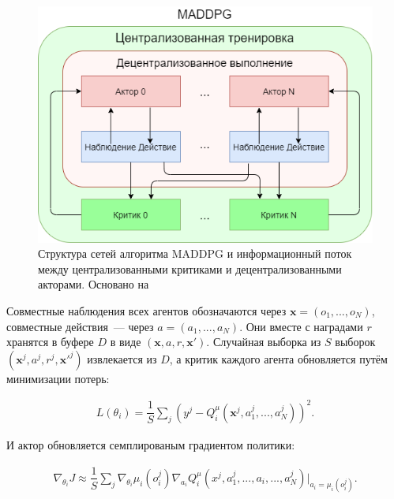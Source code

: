 \begin{figure}[ht!]
    \center
    \includegraphics [scale=0.80] {my_folder/images/ch2/maddpg.png}
    \caption{Структура сетей алгоритма MADDPG и информационный поток между централизованными критиками и децентрализованными акторами. Основано на \cite{lowe2017multiagent}}
    \label{fig:ch2-maddpg}
\end{figure}

Совместные наблюдения всех агентов обозначаются через ${\mathbf{x} = (o_1, ..., o_N)}$, совместные действия~--- через ${a = (a_1, ..., a_N)}$. Они вместе с наградами $r$ хранятся в буфере $D$ в виде ${(\mathbf{x}, a, r, \mathbf{x}')}$. Случайная выборка из $S$ выборок ${(\mathbf{x}^j, a^j, r^j, \mathbf{x}'^j)}$ извлекается из $D$, а критик каждого агента обновляется путём минимизации потерь:

\begin{equation}
    \begin{multlined}
        L(\theta_i) = \dfrac{1}{S} \sum_j (y^j - Q_{i}^\mu (\mathbf x^j, a_{1}^j, ...,a_{N}^j))^2.
    \end{multlined}
\end{equation}

И актор обновляется семплированым градиентом политики:

\begin{equation}
    \begin{multlined}
        \nabla_{\theta_i} J \approx \dfrac{1}{S} \sum_j \nabla_{\theta_i} \mu_i (o^j_i) \nabla_{a_i} Q^\mu_i (x^j, a^j_1, ..., a_i, ..., a^j_N)|_{a_i=\mu_i(o^j_i)}.
    \end{multlined}
\end{equation}

